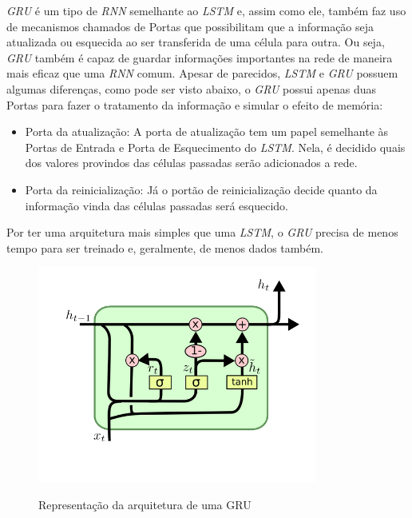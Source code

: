 \textit{\acrshort{GRU}} é um tipo de \textit{\acrshort{RNN}} semelhante ao \textit{\acrshort{LSTM}} e, assim como ele, também faz uso de mecanismos chamados de Portas que possibilitam que a informação seja atualizada ou esquecida ao ser transferida de uma célula para outra. Ou seja, \textit{\acrshort{GRU}} também é capaz de guardar informações importantes na rede de maneira mais eficaz que uma \textit{\acrshort{RNN}} comum. Apesar de parecidos, \textit{\acrshort{LSTM}} e \textit{\acrshort{GRU}} possuem algumas diferenças, como pode ser visto abaixo, o \textit{\acrshort{GRU}} possui apenas duas Portas para fazer o tratamento da informação e simular o efeito de memória:

\begin{itemize}
    \item Porta da atualização: A porta de atualização tem um papel semelhante às Portas de Entrada e Porta de Esquecimento do \textit{\acrshort{LSTM}}. Nela, é decidido quais dos valores provindos das células passadas serão adicionados a rede.
    \item Porta da reinicialização: Já o portão de reinicialização decide quanto da informação vinda das células passadas será esquecido.
\end{itemize}

Por ter uma arquitetura mais simples que uma \textit{\acrshort{LSTM}}, o \textit{\acrshort{GRU}} precisa de menos tempo para ser treinado e, geralmente, de menos dados também.

\begin{figure}[htbp]
    \centering
    \includegraphics[scale=1.0]{monography/img/GRU.png}
    \label{figure:gru}
    \caption[Representação da arquitetura de uma GRU]{Representação da arquitetura de uma GRU\footnotemark}
\end{figure}